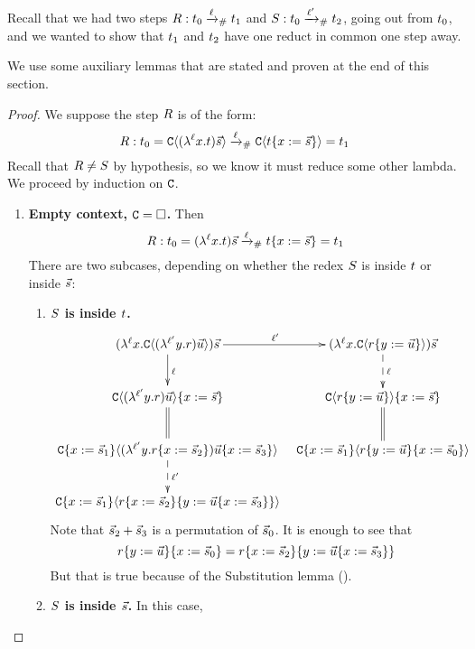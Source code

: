 Recall that we had two steps $R : t_0 \mathrel{\xrightarrow{\ell}_{\mathtt{\#}}} t_1$ and $S : t_0 \mathrel{\xrightarrow{\ell'}_{\mathtt{\#}}} t_2$, going out from $t_0$, and we wanted to show that $t_1$ and $t_2$ have one reduct in common one step away.

We use some auxiliary lemmas that are stated and proven at the end of this section.

\begin{proof}
We suppose the step $R$ is of the form:
\[
  R : t_0 = \mathtt{C}\langle(\lambda^{\ell} x. t)\vec{s}\rangle
           \mathrel{\xrightarrow{\ell}_{\mathtt{\#}}} \mathtt{C}\langle t\{x := \vec{s}\}\rangle = t_1
\]
Recall that $R \neq S$ by hypothesis, so we know it must reduce some other lambda.
We proceed by induction on $\mathtt{C}$.
\begin{enumerate}
\item {\bf Empty context, $\mathtt{C} = \Box$.}
  Then
  \[
    R : t_0 = (\lambda^{\ell} x. t)\vec{s}
             \mathrel{\xrightarrow{\ell}_{\mathtt{\#}}} t\{x := \vec{s}\} = t_1
  \]
  There are two subcases, depending on whether the redex $S$ is inside $t$
  or inside $\vec{s}$:
  \begin{enumerate}
  \item {\bf $S$ is inside $t$.}
    \[
    \xymatrix@C=.25cm{
     (\lamp{\lab}{\var}{\conof{(\lamp{\lab'}{\vartwo}{\tmfour}) \ls{\tmthree}}}) \ls{\tmtwo}
                        \ar[d]^{\lab}
                        \ar[r]^{\lab'} &
     (\lamp{\lab}{\var}{\conof{\subs{\tmfour}{\vartwo}{\ls{\tmthree}}}}) \ls{\tmtwo}
                        \ar@{-->}[d]^{\lab} \\
     \subs{\conof{(\lamp{\lab'}{\vartwo}{\tmfour}) \ls{\tmthree}}}{\var}{\ls{\tmtwo}}
                        \ar@{=}[d] &
     \subs{\conof{\subs{\tmfour}{\vartwo}{\ls{\tmthree}}}}{\var}{\ls{\tmtwo}}
                        \ar@{=}[d] \\
     \subs{\con}{\var}{\ls{\tmtwo}_1}
       \of{(\lamp{\lab'}{\vartwo}{\subs{\tmfour}{\var}{\ls{\tmtwo}_2}})
           \subs{\ls{\tmthree}}{\var}{\ls{\tmtwo}_3}}
                        \ar@{-->}[d]^{\lab'} &
     \subs{\con}{\var}{\ls{\tmtwo}_1}
       \of{\subs{\subs{\tmfour}{\vartwo}{\ls{\tmthree}}}{\var}{\ls{\tmtwo}_0}} \\
     \subs{\con}{\var}{\ls{\tmtwo}_1}
       \of{\subs{\subs{\tmfour}{\var}{\ls{\tmtwo}_2}}{\vartwo}
                 {\subs{\ls{\tmthree}}{\var}{\ls{\tmtwo}_3}}}
                         &  \\
    }
    \]
    Note that $\vec{s}_2 + \vec{s}_3$ is a permutation of $\vec{s}_0$.
    It is enough to see that
    \[r\{y := \vec{u}\}\{x := \vec{s}_0\}
      =
      r\{x := \vec{s}_2\}\{y := \vec{u}\{x := \vec{s}_3\}\}
    \]
    But that is true because of the Substitution lemma ().
  \item {\bf $S$ is inside $\vec{s}$.}
    In this case,


\end{enumerate}
\end{enumerate}
\end{proof}
